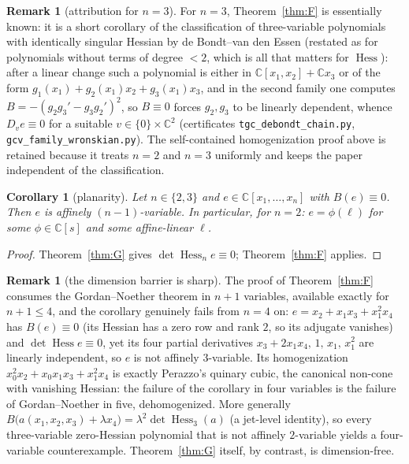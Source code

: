 \documentclass[11pt]{article}
\theoremstyle{plain}
\newtheorem{corollary}[theorem]{Corollary}
\theoremstyle{definition}
\newtheorem{remark}[theorem]{Remark}
\newcommand{\C}{\mathbb{C}}
\newcommand{\Hess}{\operatorname{Hess}}
\begin{document}
\begin{remark}[attribution for $n=3$]\label{rem:Fknown}
For $n=3$, Theorem~\ref{thm:F} is essentially known: it is a short
corollary of the classification of three-variable polynomials with
identically singular Hessian by de Bondt--van den Essen
\cite[Thm.~3.3]{dBvdE} (restated as \cite[Thm.~2.4]{deBondt2015} for
polynomials without terms of degree $<2$, which is all that matters for
$\Hess$): after a linear change such a polynomial is either in
$\C[x_1,x_2]+\C x_3$ or of the form $g_1(x_1)+g_2(x_1)x_2+g_3(x_1)x_3$,
and in the second family one computes
$B=-(g_2g_3'-g_3g_2')^2$, so $B\equiv0$ forces $g_2,g_3$ to be linearly
dependent, whence $D_ve\equiv0$ for a suitable $v\in\{0\}\times\C^2$
(certificates \texttt{tgc\_debondt\_chain.py},
\texttt{gcv\_family\_wronskian.py}). The self-contained homogenization
proof above is retained because it treats $n=2$ and $n=3$ uniformly and
keeps the paper independent of the classification.
\end{remark}

\begin{corollary}[planarity]\label{cor:planar}
Let $n\in\{2,3\}$ and $e\in\C[x_1,\dots,x_n]$ with $B(e)\equiv0$. Then
$e$ is affinely $(n-1)$-variable. In particular, for $n=2$: $e=\phi(\ell)$
for some $\phi\in\C[s]$ and some affine-linear $\ell$.
\end{corollary}

\begin{proof}
Theorem~\ref{thm:G} gives $\det\Hess_ne\equiv0$; Theorem~\ref{thm:F}
applies.
\end{proof}

\begin{remark}[the dimension barrier is sharp]\label{rem:dim}
The proof of Theorem~\ref{thm:F} consumes the Gordan--Noether theorem in
$n+1$ variables, available exactly for $n+1\le4$, and the corollary
genuinely fails from $n=4$ on: $e=x_2+x_1x_3+x_1^2x_4$ has $B(e)\equiv0$
(its Hessian has a zero row and rank $2$, so its adjugate vanishes) and
$\det\Hess e\equiv0$, yet its four partial derivatives
$x_3+2x_1x_4,\,1,\,x_1,\,x_1^2$ are linearly independent, so $e$ is not
affinely $3$-variable. Its homogenization $x_0^2x_2+x_0x_1x_3+x_1^2x_4$ is
exactly Perazzo's quinary cubic, the canonical non-cone with vanishing
Hessian: the failure of the corollary in four variables is the failure
of Gordan--Noether in five, dehomogenized. More generally
$B\bigl(a(x_1,x_2,x_3)+\lambda x_4\bigr)=\lambda^2\det\Hess_3(a)$ (a
jet-level identity), so every three-variable zero-Hessian polynomial that
is not affinely $2$-variable yields a four-variable counterexample.
Theorem~\ref{thm:G} itself, by contrast, is dimension-free.
\end{remark}
\end{document}

